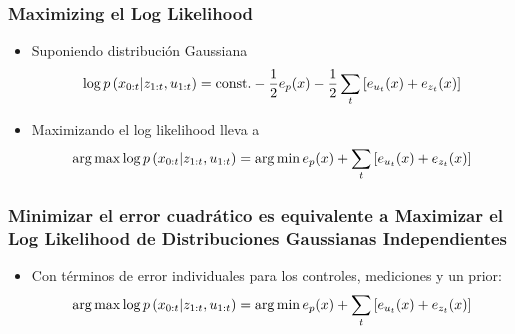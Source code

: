 \begin{frame}
    \frametitle{Maximizing el Log Likelihood}
    
    \begin{itemize}
        \item Suponiendo distribución Gaussiana
        \begin{equation*}
            \log p\left( x_{0:t} | z_{1:t}, u_{1:t} \right) = \text{const.} - \dfrac{1}{2} e_{p}(x) -  \dfrac{1}{2} \sum_{t} \left[ e_{u_{t}}(x) + e_{z_{t}}(x)\right]
        \end{equation*}
        \item Maximizando el log likelihood lleva a 
        \begin{equation*}
            \operatorname*{arg\,max} \log p\left( x_{0:t} | z_{1:t}, u_{1:t} \right) = \operatorname*{arg\,min} e_{p}(x) + \sum_{t} \left[ e_{u_{t}}(x) + e_{z_{t}}(x)\right]
        \end{equation*}
    \end{itemize}
    
    
\end{frame}

\begin{frame}
    \frametitle{Minimizar el error cuadrático es equivalente a Maximizar el Log Likelihood de Distribuciones Gaussianas Independientes}
    \begin{itemize}
        \item Con términos de error individuales para los controles, mediciones y un prior:
        \begin{equation*}
            \operatorname*{arg\,max} \log p\left( x_{0:t} | z_{1:t}, u_{1:t} \right) = \operatorname*{arg\,min} e_{p}(x) + \sum_{t} \left[ e_{u_{t}}(x) + e_{z_{t}}(x)\right]
        \end{equation*}
    \end{itemize}
    
\end{frame}


